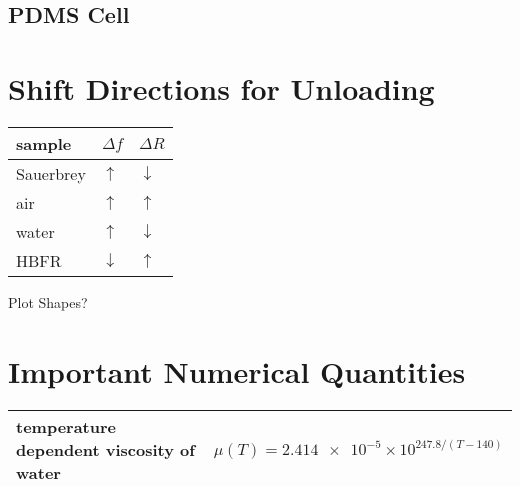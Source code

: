 \documentclass[a4paper]{article}
\begin{document}
\subsection{PDMS Cell}

\section{Shift Directions for Unloading}
\begin{tabular}{lll}
 \toprule
 sample & $\Delta f$ & $\Delta R$ \\
 \midrule
 Sauerbrey & $\uparrow$ &   $\downarrow$ \\
 air       & $\uparrow$ & $\uparrow$ \\
 water     & $\uparrow$ &   $\downarrow$ \\
 HBFR      & $\downarrow$ & $\uparrow$ \\
 \bottomrule
\end{tabular}

Plot Shapes?
\section{Important Numerical Quantities}
\begin{table}
 \centering
 \begin{tabularx}{\textwidth}{ l l }
  \toprule
  temperature dependent viscosity of water & $\mu(T)=\num{2.414e-5}\times 10^{247.8/(T-140)}$\\
  \bottomrule
 \end{tabularx}
\end{table}
\end{document}
